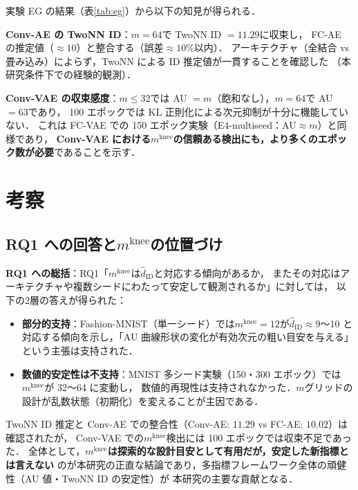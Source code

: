 \documentclass[11pt,a4paper]{jsarticle}
\newcommand{\mknee}{m^{\mathrm{knee}}}
\begin{document}
実験 EG の結果（表\ref{tab:eg}）から以下の知見が得られる．

\textbf{Conv-AE の TwoNN ID}：$m = 64$で TwoNN ID $= 11.29$に収束し，
FC-AE の推定値（$\approx 10$）と整合する（誤差$\approx 10\%$以内）．
アーキテクチャ（全結合 vs 畳み込み）によらず，TwoNN による ID 推定値が一貫することを確認した
（本研究条件下での経験的観測）．

\textbf{Conv-VAE の収束感度}：$m \leq 32$では AU $= m$（飽和なし），$m = 64$で AU $= 63$であり，
100 エポックでは KL 正則化による次元抑制が十分に機能していない．
これは FC-VAE での 150 エポック実験（E4-multiseed：AU$\approx m$）と同様であり，
\textbf{Conv-VAE における$\mknee$の信頼ある検出にも，より多くのエポック数が必要}であることを示す．

\section{考察}\label{sec:discussion}

\subsection{RQ1 への回答と$\mknee$の位置づけ}\label{sec:disc_mknee}

\textbf{RQ1 への総括}：RQ1「$\mknee$は$\hat{d}_\mathrm{ID}$と対応する傾向があるか，
またその対応はアーキテクチャや複数シードにわたって安定して観測されるか」に対しては，
以下の2層の答えが得られた：

\begin{itemize}
  \item \textbf{部分的支持}：Fashion-MNIST（単一シード）では$\mknee = 12$が$\hat{d}_\mathrm{ID} \approx 9$〜10
        と対応する傾向を示し，「AU 曲線形状の変化が有効次元の粗い目安を与える」という主張は支持された．
  \item \textbf{数値的安定性は不支持}：MNIST 多シード実験（150・300 エポック）では$\mknee$が 32〜64 に変動し，
        数値的再現性は支持されなかった．$m$グリッドの設計が乱数状態（初期化）を変えることが主因である．
\end{itemize}

TwoNN ID 推定と Conv-AE での整合性（Conv-AE: $11.29$ vs FC-AE: $10.02$）は確認されたが，
Conv-VAE での$\mknee$検出には 100 エポックでは収束不足であった．
全体として，\textbf{$\mknee$は探索的な設計目安として有用だが，安定した新指標とは言えない}
のが本研究の正直な結論であり，多指標フレームワーク全体の頑健性（AU 値・TwoNN ID の安定性）が
本研究の主要な貢献となる．
\end{document}
